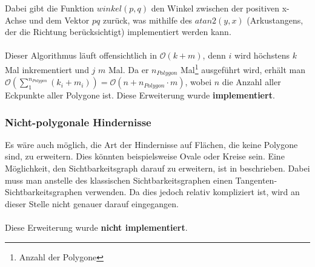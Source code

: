 \documentclass[a4paper, notitlepage, 12pt]{scrartcl}
\begin{document}
\hspace*{-1em}Dabei gibt die Funktion $winkel(p,q)$ den Winkel zwischen der positiven x-Achse und dem Vektor $pq$ zurück, was mithilfe des $atan2(y,x)$ (Arkustangens, der die Richtung berücksichtigt) implementiert werden kann.\\ \\
Dieser Algorithmus läuft offensichtlich in $\mathcal{O}(k + m)$, denn $i$ wird höchstens $k$ Mal inkrementiert und $j$ $m$ Mal. Da er $n_{Polygon}$ Mal\footnote{Anzahl der Polygone} ausgeführt wird, erhält man $\mathcal{O}(\sum_{1}^{n_{Polygon}} (k_i + m_i)) = \mathcal{O}(n + n_{Polygon} \cdot m)$, wobei $n$ die Anzahl aller Eckpunkte aller Polygone ist. Diese Erweiterung wurde \textbf{implementiert}.
 \subsubsection{Nicht-polygonale Hindernisse}
 Es wäre auch möglich, die Art der Hindernisse auf Flächen, die keine Polygone sind, zu erweitern. Dies könnten beispielsweise Ovale oder Kreise sein. Eine Möglichkeit, den Sichtbarkeitsgraph darauf zu erweitern, ist in \cite{Src:arcvis} beschrieben. Dabei muss man anstelle des klassischen Sichtbarkeitsgraphen einen Tangenten-Sichtbarkeitsgraphen verwenden. Da dies jedoch relativ kompliziert ist, wird an dieser Stelle nicht genauer darauf eingegangen. \\ \\
 Diese Erweiterung wurde \textbf{nicht implementiert}.
\end{document}
